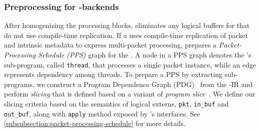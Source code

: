 \documentclass[letterpaper,twocolumn,10pt]{article}
\begin{document}



\subsubsection{Preprocessing for \ucomp-backends}
After homogenizing the processing blocks, \ucomp eliminates any
logical buffers for \uprograms that do not use compile-time replication. If a
\uprogram uses compile-time replication of packet and intrinsic
metadata to express multi-packet processing, \ucomp prepares a
\emph{Packet-Processing Schedule (PPS)} graph for the \uprogram. A
node in a PPS graph denotes the \uprogram's sub-program, called
\texttt{thread}, that processes a single packet instance, while an
edge represents dependency among threads. To prepare a PPS by
extracting sub-programs, we construct a Program Dependence Graph
(PDG)~\cite{Ferrante:1987:PDG:24039.24041} from the \uprogram-IR and
perform \emph{slicing} that is defined based on a variant of
\emph{program slice}~\cite{Weiser:1981:PS:800078.802557}. We define
our slicing criteria based on the semantics of logical externs,
\texttt{pkt}, \texttt{in\_buf} and \texttt{out\_buf}, along with
\texttt{apply} method exposed by \uarch's interfaces. See
\cref{subsubsection:packet-processing-schedule} for more details.
\end{document}
